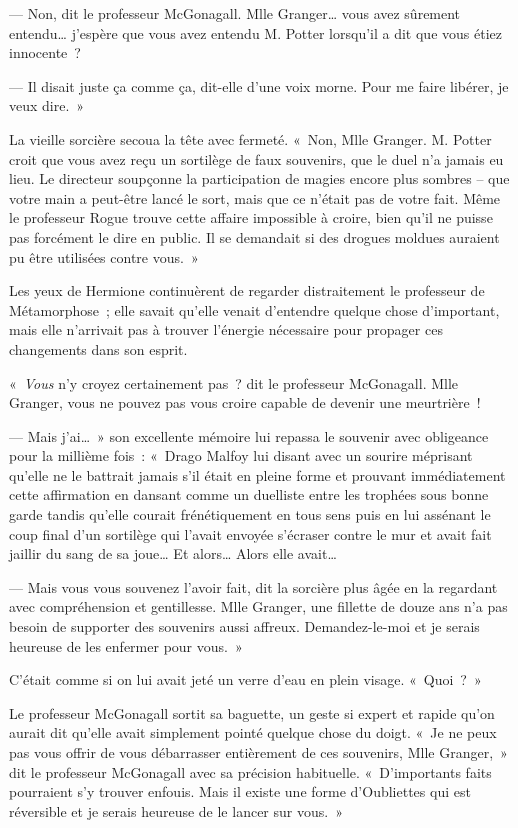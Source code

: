 --- Non, dit le professeur McGonagall.
Mlle Granger… vous avez sûrement entendu… j'espère que vous avez entendu M. Potter lorsqu'il a dit que vous étiez innocente~?

--- Il disait juste ça comme ça, dit-elle d'une voix morne.
Pour me faire libérer, je veux dire.~»

La vieille sorcière secoua la tête avec fermeté.
«~Non, Mlle Granger.
M. Potter croit que vous avez reçu un sortilège de faux souvenirs, que le duel n'a jamais eu lieu.
Le directeur soupçonne la participation de magies encore plus sombres -- que votre main a peut-être lancé le sort, mais que ce n'était pas de votre fait.
Même le professeur Rogue trouve cette affaire impossible à croire, bien qu'il ne puisse pas forcément le dire en public.
Il se demandait si des drogues moldues auraient pu être utilisées contre vous.~»

Les yeux de Hermione continuèrent de regarder distraitement le professeur de Métamorphose~; elle savait qu'elle venait d'entendre quelque chose d'important, mais elle n'arrivait pas à trouver l'énergie nécessaire pour propager ces changements dans son esprit.

«~\emph{Vous} n'y croyez certainement pas~? dit le professeur McGonagall.
Mlle Granger, vous ne pouvez pas vous croire capable de devenir une meurtrière~!

--- Mais j'ai…~»
son excellente mémoire lui repassa le souvenir avec obligeance pour la millième fois~: «~Drago Malfoy lui disant avec un sourire méprisant qu'elle ne le battrait jamais s'il était en pleine forme et prouvant immédiatement cette affirmation en dansant comme un duelliste entre les trophées sous bonne garde tandis qu'elle courait frénétiquement en tous sens puis en lui assénant le coup final d'un sortilège qui l'avait envoyée s'écraser contre le mur et avait fait jaillir du sang de sa joue…
Et alors…
Alors elle avait…

--- Mais vous vous souvenez l'avoir fait, dit la sorcière plus âgée en la regardant avec compréhension et gentillesse.
Mlle Granger, une fillette de douze ans n'a pas besoin de supporter des souvenirs aussi affreux.
Demandez-le-moi et je serais heureuse de les enfermer pour vous.~»

C'était comme si on lui avait jeté un verre d'eau en plein visage.
«~Quoi~?~»

Le professeur McGonagall sortit sa baguette, un geste si expert et rapide qu'on aurait dit qu'elle avait simplement pointé quelque chose du doigt.
«~Je ne peux pas vous offrir de vous débarrasser entièrement de ces souvenirs, Mlle Granger,~» dit le professeur McGonagall avec sa précision habituelle.
«~D'importants faits pourraient s'y trouver enfouis.
Mais il existe une forme d'Oubliettes qui est réversible et je serais heureuse de le lancer sur vous.~»

